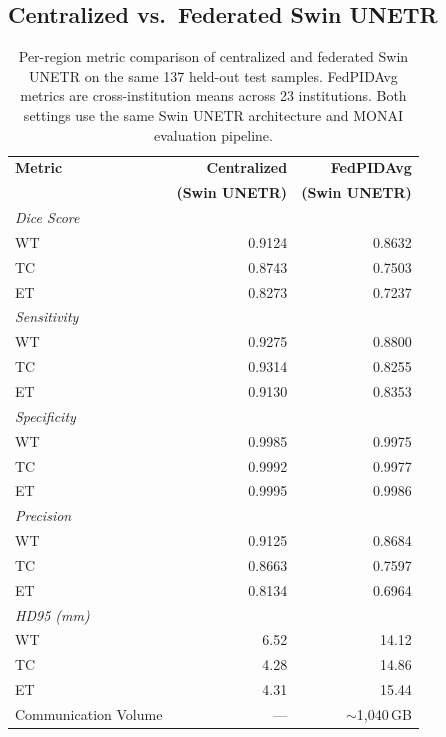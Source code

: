 \documentclass{article}
\begin{document}
\subsection{Centralized vs.\ Federated Swin UNETR}

\begin{table}[h]
\centering
\small
\begin{tabular}{lrr}
\toprule
\textbf{Metric} & \textbf{Centralized} & \textbf{FedPIDAvg} \\
 & \textbf{(Swin UNETR)} & \textbf{(Swin UNETR)} \\
\midrule
\multicolumn{3}{l}{\textit{Dice Score}} \\
\quad WT & 0.9124 & 0.8632 \\
\quad TC & 0.8743 & 0.7503 \\
\quad ET & 0.8273 & 0.7237 \\
\midrule
\multicolumn{3}{l}{\textit{Sensitivity}} \\
\quad WT & 0.9275 & 0.8800 \\
\quad TC & 0.9314 & 0.8255 \\
\quad ET & 0.9130 & 0.8353 \\
\midrule
\multicolumn{3}{l}{\textit{Specificity}} \\
\quad WT & 0.9985 & 0.9975 \\
\quad TC & 0.9992 & 0.9977 \\
\quad ET & 0.9995 & 0.9986 \\
\midrule
\multicolumn{3}{l}{\textit{Precision}} \\
\quad WT & 0.9125 & 0.8684 \\
\quad TC & 0.8663 & 0.7597 \\
\quad ET & 0.8134 & 0.6964 \\
\midrule
\multicolumn{3}{l}{\textit{HD95 (mm)}} \\
\quad WT &  6.52 & 14.12 \\
\quad TC &  4.28 & 14.86 \\
\quad ET &  4.31 & 15.44 \\
\midrule
Communication Volume & --- & $\sim$1,040\,GB \\
\bottomrule
\end{tabular}
\caption{Per-region metric comparison of centralized and federated Swin UNETR on the same 137 held-out test samples. FedPIDAvg metrics are cross-institution means across 23 institutions. Both settings use the same Swin UNETR architecture and MONAI evaluation pipeline.}
\label{tab:comparison}
\end{table}
\end{document}
